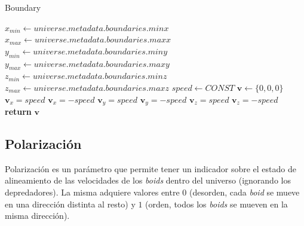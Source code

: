 \documentclass[a4paper]{article}
\begin{document}
                \begin{algorithm}
                    \caption{Boundary}\label{pseudo:boundary}
                    \begin{algorithmic}[1]
                            \State $x_{min} \gets universe.metadata.boundaries.minx$
                            \State $x_{max} \gets universe.metadata.boundaries.maxx$
                            \State $y_{min} \gets universe.metadata.boundaries.miny$
                            \State $y_{max} \gets universe.metadata.boundaries.maxy$
                            \State $z_{min} \gets universe.metadata.boundaries.minz$
                            \State $z_{max} \gets universe.metadata.boundaries.maxz$
                            \State $speed \gets CONST$
                            \State $\bm{v} \gets \{0, 0, 0\}$
                                \State $\bm{v}_x = speed$
                            \EndIf
                                \State $\bm{v}_x = -speed$
                            \EndIf
                                \State $\bm{v}_y = speed$
                            \EndIf
                                \State $\bm{v}_y = -speed$
                            \EndIf
                                \State $\bm{v}_z = speed$
                            \EndIf
                                \State $\bm{v}_z = -speed$
                            \EndIf
                            \State \textbf{return} $\bm{v}$
                        \EndProcedure
                    \end{algorithmic}
                \end{algorithm}

        \pagebreak

        \subsection{Polarización}
            Polarización es un parámetro que permite tener un indicador sobre el estado de alineamiento de las velocidades de los \textit{boids} dentro del universo (ignorando los depredadores). La misma adquiere valores entre $0$ (desorden, cada \textit{boid} se mueve en una dirección distinta al resto) y $1$ (orden, todos los \textit{boids} se mueven en la misma dirección).
\end{document}
